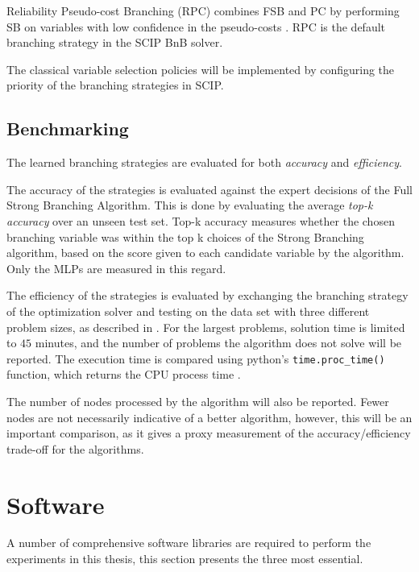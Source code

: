 Reliability Pseudo-cost Branching (\gls{RPC}) \cite{achterberg2004branching} combines \gls{FSB} and \gls{PC} by performing \gls{SB} on variables with low confidence in the pseudo-costs \cite{gamrath2018measuring}. \gls{RPC} is the default branching strategy in the \gls{SCIP} \gls{BnB} solver. 

The classical variable selection policies will be implemented by configuring the priority of the branching strategies in \gls{SCIP}. 


\subsection{Benchmarking}\label{ssec:benchmarking}

The learned branching strategies are evaluated for both \textit{accuracy} and \textit{efficiency}. 

The accuracy of the strategies is evaluated against the expert decisions of the Full Strong Branching Algorithm. This is done by evaluating the average \textit{top-k accuracy} over an unseen test set. Top-k accuracy measures whether the chosen branching variable was within the top k choices of the Strong Branching algorithm, based on the score given to each candidate variable by the algorithm. Only the \gls{MLP}s are measured in this regard. 

The efficiency of the strategies is evaluated by exchanging the branching strategy of the optimization solver and testing on the data set with three different problem sizes, as described in . For the largest problems, solution time is limited to $ 45 $ minutes, and the number of problems the algorithm does not solve will be reported.
The execution time is compared using python's \verb|time.proc_time()| function, which returns the \gls{CPU} process time \cite{rossum2009python}. 

The number of nodes processed by the algorithm will also be reported. Fewer nodes are not necessarily indicative of a better algorithm, however, this will be an important comparison, as it gives a proxy measurement of the accuracy/efficiency trade-off for the algorithms. 





\section{Software}

A number of comprehensive software libraries are required to perform the experiments in this thesis, this section presents the three most essential.  


